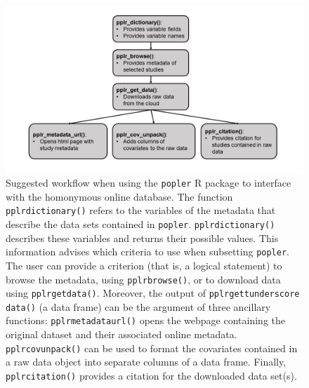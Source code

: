 \documentclass{article}\usepackage[]{graphicx}\usepackage[]{color}
\begin{document}
\newpage
\begin{figure}[h!]
  \begin{center}
    \includegraphics[scale=0.4]{pack_funs}
    \caption{Suggested workflow when using the \texttt{popler} R package to interface with the homonymous online database. The function \texttt{pplr\textunderscore dictionary()} refers to the variables of the metadata that describe the data sets contained in \texttt{popler}. \texttt{pplr\textunderscore dictionary()} describes these variables and returns their possible values. This information advises which criteria to use when subsetting \texttt{popler}. The user can provide a criterion (that is, a logical statement) to browse the metadata, using \texttt{pplr\textunderscore browse()}, or to download data using \texttt{pplr\textunderscore get\textunderscore data()}. Moreover, the output of \texttt{pplr\textunderscore get\tex tunderscore data()} (a data frame) can be the argument of three ancillary functions: \texttt{pplr\textunderscore metadata\textunderscore url()} opens the webpage containing the original dataset and their associated online metadata. \texttt{pplr\textunderscore cov\textunderscore unpack()} can be used to format the covariates contained in a raw data object into separate columns of a data frame. Finally, \texttt{pplr\textunderscore citation()} provides a citation for the downloaded data set(s).}
    \label{Fig:pack_funs}
  \end{center}
\end{figure}
\end{document}
